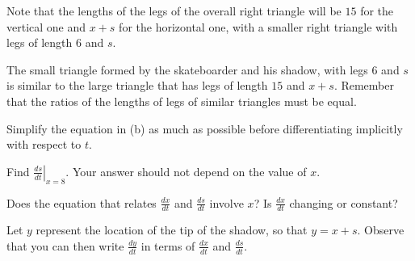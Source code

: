 \begin{bighint}
\ba
	\item Note that the lengths of the legs of the overall right triangle will be $15$ for the vertical one and $x + s$ for the horizontal one, with a smaller right triangle with legs of length 6 and $s$.
	\item The small triangle formed by the skateboarder and his shadow, with legs $6$ and $s$ is similar to the large triangle that has legs of length $15$ and $x + s$.  Remember that the ratios of the lengths of legs of similar triangles must be equal.
	\item Simplify the equation in (b) as much as possible before differentiating implicitly with respect to $t$.
	\item Find $\left. \frac{ds}{dt} \right|_{x=8}$.  Your answer should not depend on the value of $x$.
	\item Does the equation that relates $\frac{dx}{dt}$ and $\frac{ds}{dt}$ involve $x$?  Is $\frac{dx}{dt}$ changing or constant?
	\item Let $y$ represent the location of the tip of the shadow, so that $y = x + s$.  Observe that you can then write $\frac{dy}{dt}$ in terms of $\frac{dx}{dt}$ and $\frac{ds}{dt}$.
\ea
\end{bighint}
